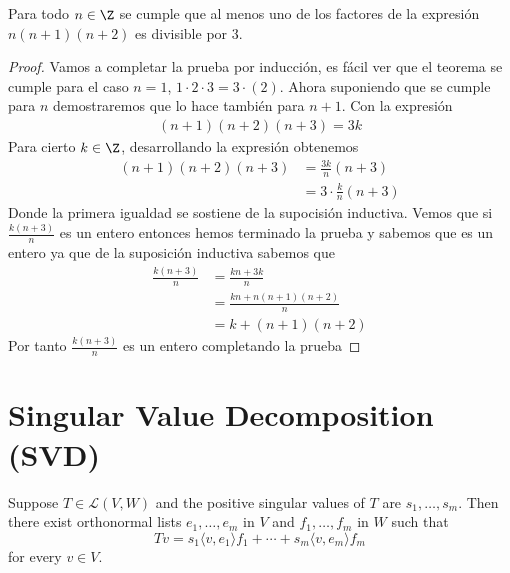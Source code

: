 \documentclass{scrartcl}
\begin{document}
\begin{theorem}
Para todo $n \in \Z$ se cumple que al menos uno de los factores de la expresión $n(n+1)(n+2)$ es divisible por 3. 
\end{theorem}
\begin{proof}
Vamos a completar la prueba por inducción, es fácil ver que el teorema se cumple para el caso $n=1$, $1 \cdot 2 \cdot 3 = 3 \cdot (2)$. Ahora suponiendo que se cumple para $n$ demostraremos que lo hace también para $n+1$. Con la expresión
\begin{align*}
(n+1)(n+2)(n+3) = 3k
\end{align*}
Para cierto $k \in \Z$, desarrollando la expresión obtenemos
\begin{align*}
(n+1)(n+2)(n+3) &= \frac{3k}{n}(n+3) \\
			    &= 3 \cdot \frac{k}{n}(n+3)
\end{align*}
Donde la primera igualdad se sostiene de la supocisión inductiva. Vemos que si $\frac{k(n+3)}{n}$ es un entero entonces hemos terminado la prueba y sabemos que es un entero ya que de la suposición inductiva sabemos que
\begin{align*}
\frac{k(n+3)}{n} &= \frac{kn+3k}{n} \\
				 &= \frac{kn + n(n+1)(n+2)}{n} \\ 
				 &= k + (n+1)(n+2)
\end{align*}
Por tanto $\frac{k(n+3)}{n}$ es un entero completando la prueba
\end{proof}

\section{Singular Value Decomposition (SVD)}

\begin{definition}[SVD]
  Suppose $T \in \mathcal{L}(V,W)$ and the positive singular values of $T$ are $s_1, \ldots , s_m$. Then there exist orthonormal lists $e_1, \ldots , e_m$ in $V$ and $f_1, \ldots ,f_m$ in $W$ such that
  \[
    Tv = s_1\langle v, e_1 \rangle f_1 + \cdots + s_m\langle v,e_m \rangle f_m \tag{3.11} \label{eq:3.11}
  \]
for every $v \in V$.
\end{definition}
\end{document}

